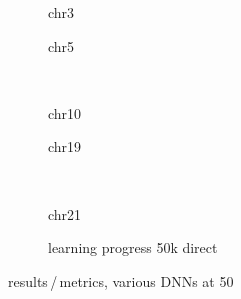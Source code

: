 \begin{figure}[p]
    \begin{subfigure}{0.45\textwidth}
        \scriptsize
        \caption{chr3}
    \end{subfigure} \hfill
    \begin{subfigure}{0.45\textwidth}
        \scriptsize
        \caption{chr5}
    \end{subfigure}\\[5mm]
    \begin{subfigure}{0.45\textwidth}
        \scriptsize
        \caption{chr10}
    \end{subfigure}\hfill
    \begin{subfigure}{0.45\textwidth}
        \scriptsize
        \caption{chr19}
    \end{subfigure}\\[3mm]
    \begin{subfigure}{0.45\textwidth}
        \scriptsize
        \caption{chr21}
    \end{subfigure}\hfill
    \begin{subfigure}{0.45\textwidth}
        \caption{learning progress 50k direct} \label{fig:results:50k_lossEpochs}
    \end{subfigure}
    \caption{results\,/\,metrics, various DNNs at \SI{50}{\kilo\bp}} \label{fig:results:DNN50k_pearson}
\end{figure}

